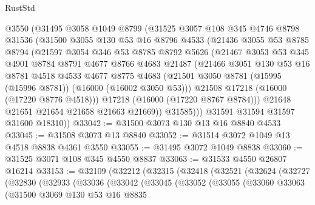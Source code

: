 \begin{lexlean}{RustStd}
\begin{coremodule}
        @3550
        (@31495
          @3058
          @1049
          @8799
          (@31525
            @3057
            @108
            @345
            @4746
            @8798
            @31536
            (@31500
              @3055
              @130
              @53
              @16
              @8796
              @4533
              (@21436
                @3055
                @53
                @8785
                @8794
                (@21597
                  @3054
                  @346
                  @53
                  @8785
                  @8792
                  @5626
                  (@21467
                    @3053
                    @53
                    @345
                    @4901
                    @8784
                    @8791
                    @4677
                    @8766
                    @4683
                    @21487
                    (@21466
                      @3051
                      @130
                      @53
                      @16
                      @8781
                      @4518
                      @4533
                      @4677
                      @8775
                      @4683
                      (@21501 @3050 @8781 (@15995 (@15996 @8781)) (@16000 (@16002 @3050 @53)))
                      @21508
                      @17218
                      (@16000 (@17220 @8776 @4518)))
                    @17218
                    (@16000 (@17220 @8767 @8784)))
                  @21648
                  @21651
                  @21654
                  @21658
                  @21663
                  @21669))
              @31585)))
        @31591
        @31594
        @31597
        @31600
        @18310))
@33042 := @31500 @3073 @130 @13 @16 @8840 @4533
@33045 := @31508 @3073 @13 @8840
@33052 := @31514 @3072 @1049 @13 @4518 @8838 @4361 @3550
@33055 := @31495 @3072 @1049 @8838
@33060 := @31525 @3071 @108 @345 @4550 @8837
@33063 := @31533 @4550 @26807 @16214
@33153 := @32109
    (@32212
      (@32315
        (@32418
          (@32521
            (@32624
              (@32727
                (@32830
                  (@32933
                    (@33036
                      (@33042
                        (@33045
                          (@33052
                            (@33055
                              (@33060
                                @33063
                                (@31500
                                  @3069
                                  @130
                                  @53
                                  @16
                                  @8835

\end{coremodule}
\end{lexlean}
